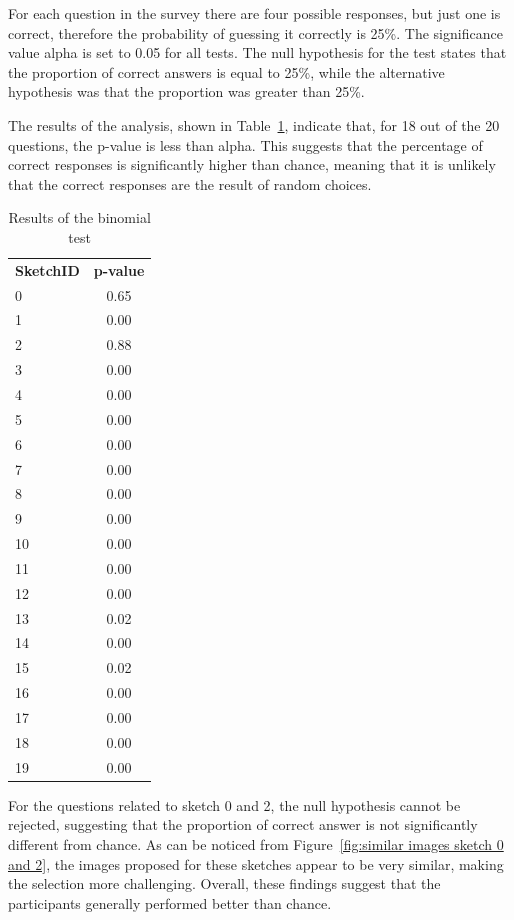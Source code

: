 \noindent For each question in the survey there are four possible responses, but just one is correct, therefore the probability of guessing it correctly is \num{25}\%.
The significance value alpha is set to \num{0.05} for all tests. The null hypothesis for the test states that the proportion of correct answers is equal to \num{25}\%, while the alternative hypothesis was that the proportion was greater than \num{25}\%.

\noindent The results of the analysis, shown in Table~\ref{tab:binomial test results}, indicate that, for \num{18} out of the \num{20} questions, the p-value is less than alpha. This suggests that the percentage of correct responses is significantly higher than chance, meaning that it is unlikely that the correct responses are the result of random choices.
%
\begin{table}[!ht]
\begin{center}
    \begin{tabular}{lc}
    \textbf{SketchID} & \textbf{p-value}  \\
    0 & 0.65 \\
    1 & 0.00 \\
    2 & 0.88 \\
    3 & 0.00 \\
    4 & 0.00 \\
    5 & 0.00 \\
    6 & 0.00 \\
    7 & 0.00 \\
    8 & 0.00 \\
    9 & 0.00 \\
    10 & 0.00 \\
    11 & 0.00 \\
    12 & 0.00 \\
    13 & 0.02 \\
    14 & 0.00 \\
    15 & 0.02 \\
    16 & 0.00 \\
    17 & 0.00 \\
    18 & 0.00 \\
    19 & 0.00 \\
    \end{tabular}
     \caption{\label{tab:binomial test results}Results of the binomial test}
\end{center}
\end{table}

\noindent For the questions related to sketch \num{0} and \num{2}, the null hypothesis cannot be rejected, suggesting that the proportion of correct answer is not significantly different from chance. As can be noticed from Figure~\ref{fig:similar images sketch 0 and 2}, the images proposed for these sketches appear to be very similar, making the selection more challenging.
Overall, these findings suggest that the participants generally performed better than chance.

